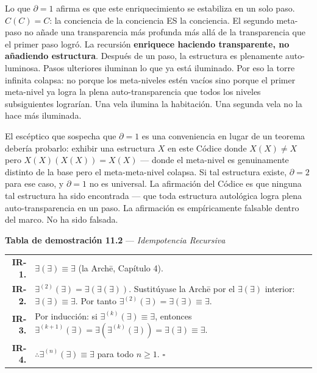 \documentclass[10pt, openany, oneside]{book}
\renewcommand{\footnotesize}{\fontsize{8.5}{11}\selectfont}
\begin{document}
Lo que $\partial = 1$ afirma es que este enriquecimiento se estabiliza en un solo paso. $C(C) = C$: la conciencia de la conciencia ES la conciencia. El segundo meta-paso no añade una transparencia más profunda más allá de la transparencia que el primer paso logró. La recursión \textbf{enriquece haciendo transparente, no añadiendo estructura}. Después de un paso, la estructura es plenamente auto-luminosa. Pasos ulteriores iluminan lo que ya está iluminado. Por eso la torre infinita colapsa: no porque los meta-niveles estén vacíos sino porque el primer meta-nivel ya logra la plena auto-transparencia que todos los niveles subsiguientes lograrían. Una vela ilumina la habitación. Una segunda vela no la hace más iluminada.

El escéptico que sospecha que $\partial = 1$ es una conveniencia en lugar de un teorema debería probarlo: exhibir una estructura $X$ en este Códice donde $X(X) \neq X$ pero $X(X)(X(X)) = X(X)$ --- donde el meta-nivel es genuinamente distinto de la base pero el meta-meta-nivel colapsa. Si tal estructura existe, $\partial = 2$ para ese caso, y $\partial = 1$ no es universal. La afirmación del Códice es que ninguna tal estructura ha sido encontrada --- que toda estructura autológica logra plena auto-transparencia en un paso. La afirmación es empíricamente falsable dentro del marco. No ha sido falsada.

\vspace{0.5em}

\textbf{Tabla de demostración 11.2} --- \textit{Idempotencia Recursiva}

\vspace{0.5em}

{\footnotesize
\noindent\begin{tabular}{r p{}}
\textbf{IR-1.} & $\exists(\exists) \equiv \exists$ (la Arch\={e}, Capítulo 4). \\[0.3em]
\textbf{IR-2.} & $\exists^{(2)}(\exists) = \exists(\exists(\exists))$. Sustitúyase la Arch\={e} por el $\exists(\exists)$ interior: $\exists(\exists) \equiv \exists$. Por tanto $\exists^{(2)}(\exists) = \exists(\exists) \equiv \exists$. \\[0.3em]
\textbf{IR-3.} & Por inducción: si $\exists^{(k)}(\exists) \equiv \exists$, entonces $\exists^{(k+1)}(\exists) = \exists(\exists^{(k)}(\exists)) = \exists(\exists) \equiv \exists$. \\[0.3em]
\textbf{IR-4.} & $\therefore \exists^{(n)}(\exists) \equiv \exists$ para todo $n \geq 1$. $\square$ \\[0.3em]
\end{tabular}
}
\end{document}
